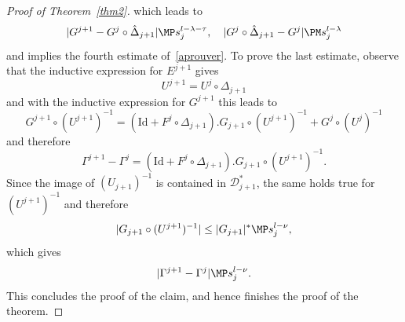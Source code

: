 \begin{proof}[Proof of Theorem~\ref{thm2}]
which leads to
\begin{equation*}
|G^{j+1}-G^j \circ \hat{\Delta}_{j+1}| \MP s_j^{l-\lambda-\tau}, \quad
|G^j \circ \hat{\Delta}_{j+1}-G^j| \PM s_j^{l-\lambda}
\end{equation*}
and implies the fourth estimate of~\eqref{aprouver}. To prove the last estimate, observe that the inductive expression for $E^{j+1}$ gives
\[ U^{j+1}=U^j \circ \Delta_{j+1} \]
and with the inductive expression for $G^{j+1}$ this leads to
\[ G^{j+1} \circ (U^{j+1})^{-1}=(\mathrm{Id}+F^j \circ \Delta_{j+1}).G_{j+1} \circ (U^{j+1})^{-1}+G^j\circ (U^{j})^{-1} \]
and therefore
\[ \Gamma^{j+1}-\Gamma^j=(\mathrm{Id}+F^j \circ \Delta_{j+1}).G_{j+1} \circ (U^{j+1})^{-1}. \]
Since the image of $(U_{j+1})^{-1}$ is contained in $\mathcal{D}_{j+1}^*$, the same holds true for $(U^{j+1})^{-1}$ and therefore
\[ |G_{j+1} \circ (U^{j+1})^{-1}| \leq |G_{j+1}|^* \MP s_j^{l-\nu}, \]
which gives
\[ |\Gamma^{j+1}-\Gamma^j| \MP s_j^{l-\nu}. \]
This concludes the proof of the claim, and hence finishes the proof of the theorem.
\end{proof}

\Changelback
